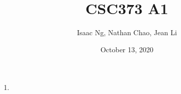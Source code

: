 \documentclass{article}
\title{CSC373 A1}
\author{Isaac Ng, Nathan Chao, Jean Li}
\date{October 13, 2020}
\begin{document}
\maketitle
\begin{enumerate}
    \item %
        
            

\end{enumerate}
\end{document}
